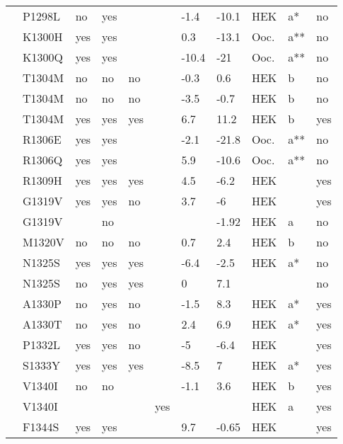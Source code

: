 \begin{tiny}
\begin{longtable}{p{4cm}|l|llll|ll|lll}
\citet{Gui2010bMutationDB} & P1298L & no & yes &  &  & -1.4 & -10.1 & HEK & a* & no \\
\citet{Chen1996MutationDB} & K1300H & yes & yes &  &  & 0.3 & -13.1 & Ooc. & a** & no \\
\citet{Chen1996MutationDB} & K1300Q & yes & yes &  &  & -10.4 & -21 & Ooc. & a** & no \\
\citet{Beyder2014MutationDB} & T1304M & no & no & no &  & -0.3 & 0.6 & HEK & b & no \\
\citet{Kapplinger2015MutationDB} & T1304M & no & no & no &  & -3.5 & -0.7 & HEK & b & no \\
\citet{Wang2007aMutationDB} & T1304M & yes & yes & yes &  & 6.7 & 11.2 & HEK & b & yes \\
\citet{Chen1996MutationDB} & R1306E & yes & yes &  &  & -2.1 & -21.8 & Ooc. & a** & no \\
\citet{Chen1996MutationDB} & R1306Q & yes & yes &  &  & 5.9 & -10.6 & Ooc. & a** & no \\
\citet{Wang2016MutationDB} & R1309H & yes & yes & yes &  & 4.5 & -6.2 & HEK &  & yes \\
\citet{Casini2007MutationDB} & G1319V & yes & yes & no &  & 3.7 & -6 & HEK &  & yes \\
\citet{Hoshi2014MutationDB} & G1319V &  & no &  &  &  & -1.92 & HEK & a & no \\
\citet{Kapplinger2015MutationDB} & M1320V & no & no & no &  & 0.7 & 2.4 & HEK & b & no \\
\citet{Wang1996MutationDB} & N1325S & yes & yes & yes &  & -6.4 & -2.5 & HEK & a* & no \\
\citet{Yong2007MutationDB} & N1325S & no & yes & yes &  & 0 & 7.1 &  &  & no \\
\citet{Wedekind2001MutationDB} & A1330P & no & yes & no &  & -1.5 & 8.3 & HEK & a* & yes \\
\citet{Smits2005bMutationDB} & A1330T & no & yes & no &  & 2.4 & 6.9 & HEK & a* & yes \\
\citet{Ruan2007MutationDB} & P1332L & yes & yes & no &  & -5 & -6.4 & HEK &  & yes \\
\citet{Huang2009MutationDB} & S1333Y & yes & yes & yes &  & -8.5 & 7 & HEK & a* & yes \\
\citet{Samani2009MutationDB} & V1340I & no & no &  &  & -1.1 & 3.6 & HEK & b & yes \\
\citet{Samani2009MutationDB} & V1340I &  &  &  & yes &  &  & HEK & a & yes \\
\citet{Keller2006MutationDB} & F1344S & yes & yes &  &  & 9.7 & -0.65 & HEK &  & yes \\

\end{longtable}
\end{tiny}

